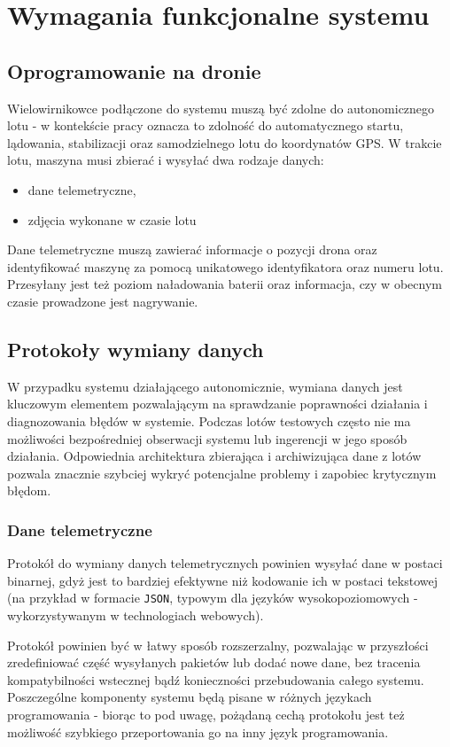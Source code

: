 \chapter{Wymagania funkcjonalne systemu}

\section{Oprogramowanie na dronie}

Wielowirnikowce podłączone do systemu muszą być
zdolne do autonomicznego lotu - w kontekście pracy
oznacza to zdolność do automatycznego startu,
lądowania, stabilizacji oraz samodzielnego
lotu do koordynatów GPS. W trakcie lotu, maszyna musi
zbierać i wysyłać dwa rodzaje danych:
\begin{itemize}
    \item dane telemetryczne,
    \item zdjęcia wykonane w czasie lotu
\end{itemize}

Dane telemetryczne muszą zawierać informacje o pozycji
drona oraz identyfikować maszynę za pomocą unikatowego
identyfikatora oraz numeru lotu. Przesyłany jest też
poziom naładowania baterii oraz informacja, czy w obecnym
czasie prowadzone jest nagrywanie.

\section{Protokoły wymiany danych}

W przypadku systemu działającego autonomicznie, wymiana danych jest kluczowym
elementem pozwalającym na sprawdzanie poprawności działania
i diagnozowania błędów w systemie. Podczas lotów testowych
często nie ma możliwości bezpośredniej obserwacji systemu
lub ingerencji w jego sposób działania. Odpowiednia architektura
zbierająca i archiwizująca dane z lotów pozwala znacznie szybciej 
wykryć potencjalne problemy i zapobiec krytycznym błędom. 

\subsection{Dane telemetryczne}
Protokół do wymiany danych telemetrycznych powinien
wysyłać dane w postaci binarnej, gdyż jest to bardziej
efektywne niż kodowanie ich w postaci tekstowej (na
przykład w formacie \texttt{JSON}, typowym dla języków
wysokopoziomowych - wykorzystywanym w technologiach webowych).

Protokół powinien być w łatwy sposób rozszerzalny,
pozwalając w przyszłości zredefiniować część wysyłanych
pakietów lub dodać nowe dane, bez tracenia kompatybilności
wstecznej bądź konieczności przebudowania całego systemu.
Poszczególne komponenty systemu będą pisane w różnych
językach programowania - biorąc to pod uwagę, pożądaną
cechą protokołu jest też możliwość szybkiego przeportowania
go na inny język programowania. 

